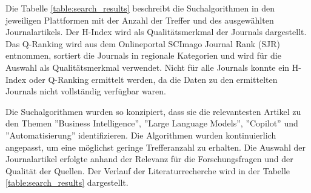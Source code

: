 Die Tabelle \ref{table:search_results} beschreibt die Suchalgorithmen in den jeweiligen Plattformen mit der Anzahl der Treffer und des ausgewählten Journalartikels. Der H-Index wird als Qualitätsmerkmal der Journals dargestellt.%
Das Q-Ranking wird aus dem Onlineportal SCImago Journal Rank (SJR)%
 entnommen, sortiert die Journals in regionale Kategorien und wird für die Auswahl als Qualitätsmerkmal verwendet. Nicht für alle Journals konnte ein H-Index oder Q-Ranking ermittelt werden, da die Daten zu den ermittelten Journals nicht vollständig verfügbar waren.

Die Suchalgorithmen wurden so konzipiert, dass sie die relevantesten Artikel zu den Themen ''Business Intelligence'', ''Large Language Models'', ''Copilot'' und ''Automatisierung'' identifizieren. Die Algorithmen wurden kontinuierlich angepasst, um eine möglichst geringe Trefferanzahl zu erhalten. Die Auswahl der Journalartikel erfolgte anhand der Relevanz für die Forschungsfragen und der Qualität der Quellen. Der Verlauf der Literaturrecherche wird in der Tabelle \ref{table:search_results} dargestellt.

